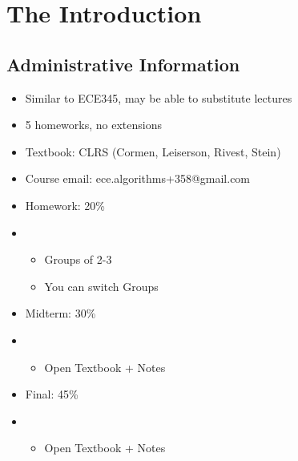 \chapter{The Introduction}
\section{Administrative Information}

\begin{itemize}
    \item Similar to ECE345, may be able to substitute lectures
    \item 5 homeworks, no extensions
    \item Textbook: CLRS (Cormen, Leiserson, Rivest, Stein)
    \item Course email: ece.algorithms+358@gmail.com
    \item Homework: 20\%
    \item \begin{itemize}
        \item Groups of 2-3
        \item You can switch Groups
    \end{itemize}
    \item Midterm: 30\%
    \item \begin{itemize}
        \item Open Textbook + Notes
    \end{itemize}
    \item Final: 45\%
    \item \begin{itemize}
        \item Open Textbook + Notes
    \end{itemize}
\end{itemize}

